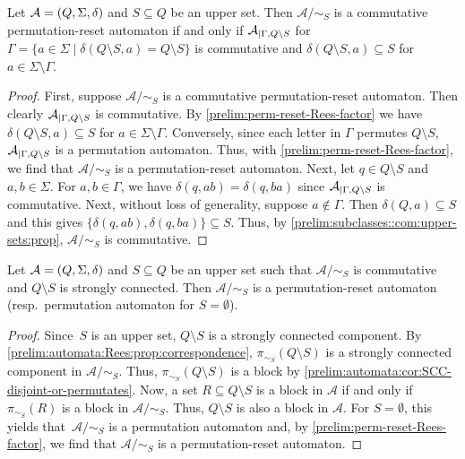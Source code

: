 \begin{corollary} \label{prelim:classes:comm:prop:perm-reset-comm}
	Let  $\mathcal A = (Q, \Sigma, \delta)$ and $S \subseteq Q$ be an upper set.
	Then $\mathcal A / {\sim_S}$ is a commutative permutation-reset automaton
	if and only if
	$\mathcal A_{|\Gamma, Q \setminus S}$
	for  $\Gamma = \{ a \in \Sigma \mid \delta(Q \setminus S, a) = Q \setminus S \}$
	is commutative and $\delta(Q \setminus S, a) \subseteq S$
	for $a \in \Sigma \setminus \Gamma$.	
\end{corollary}
\begin{proof}
	First, suppose $\mathcal A / {\sim_S}$ is a commutative permutation-reset automaton.
	Then clearly $\mathcal A_{|\Gamma, Q \setminus S}$
	is commutative. By \cref{prelim:perm-reset-Rees-factor} we have 
	$\delta(Q \setminus S, a) \subseteq S$ for $a \in \Sigma \setminus \Gamma$.
	Conversely, since each letter in $\Gamma$ permutes $Q \setminus S$,
	$\mathcal A_{|\Gamma, Q \setminus S}$ is a permutation automaton.
	Thus, with \cref{prelim:perm-reset-Rees-factor},
	we find that $\mathcal A / {\sim_S}$ is a permutation-reset automaton.
	Next, let $q \in Q \setminus S$ and $a,b \in \Sigma$.
	For $a,b \in \Gamma$, we have $\delta(q, ab) = \delta(q, ba)$
	since 	$\mathcal A_{|\Gamma, Q \setminus S}$
	is commutative.
	Next, without loss of generality, suppose $a \notin \Gamma$.
	Then $\delta(Q, a) \subseteq S$
	and this gives $\{ \delta(q, ab), \delta(q, ba) \}\subseteq S$.
	Thus, by \cref{prelim:subclasses::com:upper-sets:prop}, 
	$\mathcal A / {\sim_S}$ is commutative.	
\end{proof}

\begin{corollary} \label{cor:SCC_comm_permutation_automaton}
	Let  $\mathcal A = (Q, \Sigma, \delta)$ and $S \subseteq Q$ be an upper set
	such that  $\mathcal A / {\sim_S}$ is commutative and $Q \setminus S$ is strongly connected.
	Then $\mathcal A / {\sim_S}$ is a permutation-reset automaton (resp.~permutation automaton for $S = \emptyset$).	
\end{corollary}
\begin{proof}
	Since~$S$ is an upper set, $Q \setminus S$ is a strongly connected component.
	By \cref{prelim:automata:Rees:prop:correspondence},
	$\pi_{\sim_S}(Q \setminus S)$ is a strongly connected component in $\mathcal A / {\sim_S}$.
	Thus, $\pi_{\sim_S}(Q \setminus S)$ is a block by 
	\cref{prelim:automata:cor:SCC-disjoint-or-permutates}.
	Now, a set $R \subseteq Q \setminus S$ is a block in $\mathcal A$ if and only if $\pi_{\sim_S}(R)$
	is a block in $\mathcal A / {\sim_S}$. 
	Thus, $Q \setminus S$ is also a block in $\mathcal A$. 
	For $S = \emptyset$, this yields that~$\mathcal A / {\sim_S}$
	is a permutation automaton
	and, by \cref{prelim:perm-reset-Rees-factor}, we find that $\mathcal A / {\sim_S}$
	is a permutation-reset automaton.	
\end{proof}

